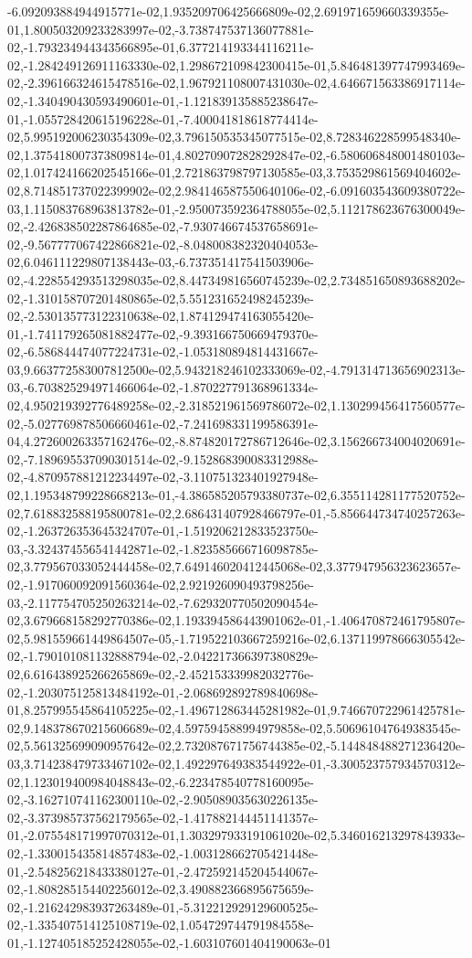 -6.092093884944915771e-02,1.935209706425666809e-02,2.691971659660339355e-01,1.800503209233283997e-02,-3.738747537136077881e-02,-1.793234944343566895e-01,6.377214193344116211e-02,-1.284249126911163330e-02,1.298672109842300415e-01,5.846481397747993469e-02,-2.396166324615478516e-02,1.967921108007431030e-02,4.646671563386917114e-02,-1.340490430593490601e-01,-1.121839135885238647e-01,-1.055728420615196228e-01,-7.400041818618774414e-02,5.995192006230354309e-02,3.796150535345077515e-02,8.728346228599548340e-02,1.375418007373809814e-01,4.802709072828292847e-02,-6.580606848001480103e-02,1.017424166202545166e-01,2.721863798797130585e-03,3.753529861569404602e-02,8.714851737022399902e-02,2.984146587550640106e-02,-6.091603543609380722e-03,1.115083768963813782e-01,-2.950073592364788055e-02,5.112178623676300049e-02,-2.426838502287864685e-02,-7.930746674537658691e-02,-9.567777067422866821e-02,-8.048008382320404053e-02,6.046111229807138443e-03,-6.737351417541503906e-02,-4.228554293513298035e-02,8.447349816560745239e-02,2.734851650893688202e-02,-1.310158707201480865e-02,5.551231652498245239e-02,-2.530135773122310638e-02,1.874129474163055420e-01,-1.741179265081882477e-02,-9.393166750669479370e-02,-6.586844474077224731e-02,-1.053180894814431667e-03,9.663772583007812500e-02,5.943218246102333069e-02,-4.791314713656902313e-03,-6.703825294971466064e-02,-1.870227791368961334e-02,4.950219392776489258e-02,-2.318521961569786072e-02,1.130299456417560577e-02,-5.027769878506660461e-02,-7.241698331199586391e-04,4.272600263357162476e-02,-8.874820172786712646e-02,3.156266734004020691e-02,-7.189695537090301514e-02,-9.152868390083312988e-02,-4.870957881212234497e-02,-3.110751323401927948e-02,1.195348799228668213e-01,-4.386585205793380737e-02,6.355114281177520752e-02,7.618832588195800781e-02,2.686431407928466797e-01,-5.856644734740257263e-02,-1.263726353645324707e-01,-1.519206212833523750e-03,-3.324374556541442871e-02,-1.823585666716098785e-02,3.779567033052444458e-02,7.649146020412445068e-02,3.377947956323623657e-02,-1.917060092091560364e-02,2.921926090493798256e-03,-2.117754705250263214e-02,-7.629320770502090454e-02,3.679668158292770386e-02,1.193394586443901062e-01,-1.406470872461795807e-02,5.981559661449864507e-05,-1.719522103667259216e-02,6.137119978666305542e-02,-1.790101081132888794e-02,-2.042217366397380829e-02,6.616438925266265869e-02,-2.452153339982032776e-02,-1.203075125813484192e-01,-2.068692892789840698e-01,8.257995545864105225e-02,-1.496712863445281982e-01,9.746670722961425781e-02,9.148378670215606689e-02,4.597594588994979858e-02,5.506961047649383545e-02,5.561325699090957642e-02,2.732087671756744385e-02,-5.144848488271236420e-03,3.714238479733467102e-02,1.492297649383544922e-01,-3.300523757934570312e-02,1.123019400984048843e-02,-6.223478540778160095e-02,-3.162710741162300110e-02,-2.905089035630226135e-02,-3.373985737562179565e-02,-1.417882144451141357e-01,-2.075548171997070312e-01,1.303297933191061020e-02,5.346016213297843933e-02,-1.330015435814857483e-02,-1.003128662705421448e-01,-2.548256218433380127e-01,-2.472592145204544067e-02,-1.808285154402256012e-02,3.490882366895675659e-02,-1.216242983937263489e-01,-5.312212929129600525e-02,-1.335407514125108719e-02,1.054729744791984558e-01,-1.127405185252428055e-02,-1.603107601404190063e-01
